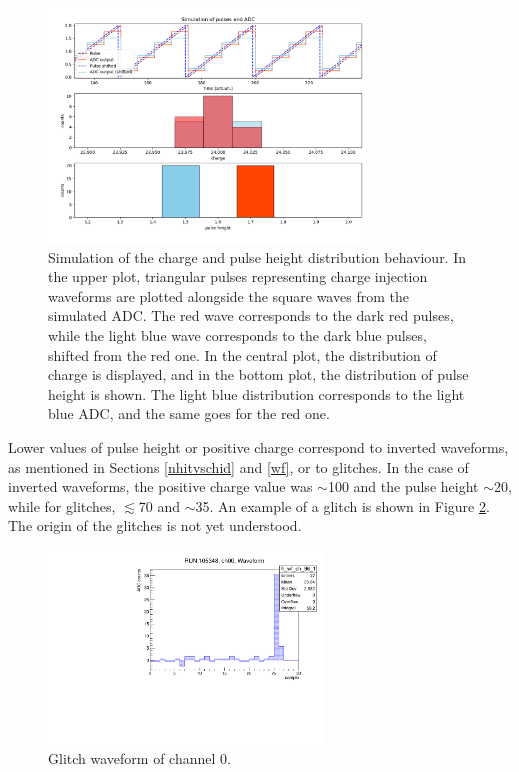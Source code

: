 \begin{figure}[!h]
  \centering
  \includegraphics[width=0.75\textwidth]{figures/png/pres.png}
  \caption[A simulation of the charge and pulse height distribution behaviour.]{Simulation of the charge and pulse height distribution behaviour. 
  In the upper plot, triangular pulses representing charge injection waveforms are 
  plotted alongside the square waves from the simulated ADC. The red wave corresponds to the dark red pulses, 
  while the light blue wave corresponds to the dark blue pulses, shifted from the red one. In the central plot, 
  the distribution of charge is displayed, and in the bottom plot, the distribution of pulse height is shown. 
  The light blue distribution corresponds to the light blue ADC, and the same goes for the red one.}
  \label{fig:simsim}
\end{figure}
Lower values of pulse height or positive charge correspond to 
inverted waveforms, as mentioned in Sections \ref{nhitvschid} 
and \ref{wf}, 
or to glitches. In the case of inverted waveforms, 
the positive charge value was $\sim$100 and the pulse height 
$\sim$20, while for glitches, $\lesssim$70 and $\sim$35. 
An example of a glitch is shown in Figure 
\ref{fig:glitches}. The origin of the glitches 
is not yet understood.
\begin{figure}[!h]
  \centering
  \includegraphics[width=0.65\textwidth]{figures/pdf/glitch.pdf}
  \caption[Glitch waveform of channel 0.]{Glitch waveform of channel 0.}
  \label{fig:glitches}
\end{figure}
